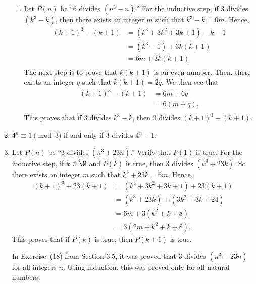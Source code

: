 \begin{enumerate}
\begin{enumerate}
\item Let $P \left( n \right)$ be ``6 divides $\left( n^3 - n \right)$.''  For the inductive step, if 3 divides $ \left( k^3 -k \right)$, then there exists an integer $m$ such that $k^3 - k = 6m$.  Hence,
\[
\begin{aligned}
\left( k + 1 \right)^3 - \left( k  + 1 \right) &= \left( k^3 + 3k^2 + 3k + 1 \right) - k - 1 \\
  &= \left( k^3 - 1 \right) + 3k \left( k + 1 \right) \\
  &= 6m + 3k \left( k + 1 \right) \\
\end{aligned}
\]
The next step is to prove that $k \left( k + 1 \right)$ is an even number.  Then, there exists an integer $q$ such that $k \left( k + 1 \right) = 2q$.  We then see that
\[
\begin{aligned}
\left( k + 1 \right)^3 - \left( k  + 1 \right) &= 6m + 6q \\
                                               &= 6 \left( m + q \right). \\
\end{aligned}
\]
This proves that if 3 divides $k^3 - k$, then 3 divides 
$\left( k + 1 \right)^3 - \left( k + 1 \right)$.
\end{enumerate}



\item $4^n  \equiv 1 \pmod 3$  if and only if  3 divides $4^n - 1$.


\item Let $P \left( n \right)$ be ``3 divides $(n^3 + 23n)$.''  Verify that $P(1)$ is true.  For the inductive step, if $k \in \N$ and $P(k)$ is true, then 3 divides 
$(k^3 + 23k) $.  So there exists an integer $m$ such that $k^3 +23k = 6m$.  Hence,
\begin{align*}
( k + 1 )^3 + 23( k  + 1) &= \left( k^3 + 3k^2 + 3k + 1 \right) +23(k + 1) \\
  &= (k^3 + 23k) + (3k^2 + 3k + 24) \\
  &= 6m + 3( k^2 + k + 8) \\
  &= 3(2m + k^2 + k + 8).
\end{align*}
This proves that if $P(k)$ is true, then $P(k+1)$ is true.

In Exercise~(18) from Section 3.5, it was proved that 3 divides $(n^3 + 23n)$ for all integers $n$.  Using induction, this was proved only for all natural numbers.




\end{enumerate}
